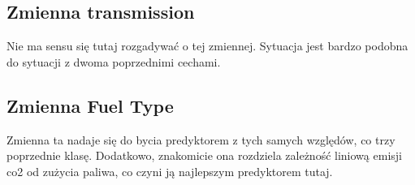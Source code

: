 \documentclass{article}
\begin{document}
\subsection{Zmienna transmission}
Nie ma sensu się tutaj rozgadywać o tej zmiennej. Sytuacja jest bardzo podobna do sytuacji z dwoma poprzednimi cechami.

\subsection{Zmienna Fuel Type}
Zmienna ta nadaje się do bycia predyktorem z tych samych względów, co trzy poprzednie klasę. 
Dodatkowo, znakomicie ona rozdziela zależność liniową emisji co2 od zużycia paliwa, co czyni ją najlepszym predyktorem tutaj.
\end{document}
